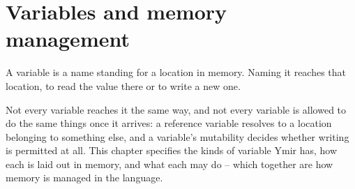 \chapter{Variables and memory management}
\label{chap:memory}

A variable is a name standing for a location in memory. Naming it reaches that
location, to read the value there or to write a new one.

Not every variable reaches it the same way, and not every variable is allowed to
do the same things once it arrives: a reference variable resolves to a location
belonging to something else, and a variable's mutability decides whether writing
is permitted at all. This chapter specifies the kinds of variable Ymir has, how
each is laid out in memory, and what each may do -- which together are how memory
is managed in the language.

\minitoc%









